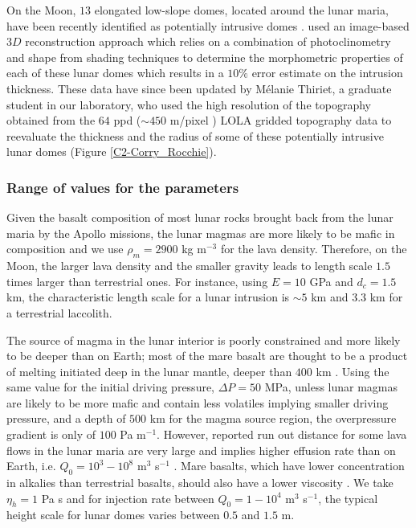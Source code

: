 On the Moon, $13$ elongated  low-slope domes, located around the lunar
maria, have  been recently  identified as potentially  intrusive domes
\citep{Wohler:2007it,Wohler:2009jj}.   \citet{Wohler:2009jj}  used  an
image-based $3D$ reconstruction approach which relies on a combination
of photoclinometry and shape from  shading techniques to determine the
morphometric properties of each of  these lunar domes which results in
a $10\%$  error estimate on  the intrusion thickness. These  data have
since  been updated  by Mélanie  Thiriet,  a graduate  student in  our
laboratory, who  used the high  resolution of the  topography obtained
from  the  $64$ ppd  ($\sim  450$  m/pixel \citep{Zuber:2009bq})  LOLA
gridded topography data to reevaluate  the thickness and the radius of
some of these potentially intrusive lunar domes (Figure \ref{C2-Corry_Rocchie}).

\subsubsection*{Range of values for the parameters}

Given the basalt composition of most lunar rocks brought back from the
lunar maria by  the Apollo missions, the lunar magmas  are more likely
to be mafic in composition and we  use $\rho_m = 2900$ kg m$^{-3}$ for
the lava density. Therefore, on the  Moon, the larger lava density and
the  smaller gravity  leads to  length scale  $1.5$ times  larger than
terrestrial ones. For  instance, using $E=10$ GPa and $d_c  = 1.5$ km,
the characteristic length  scale for a lunar intrusion is  $\sim 5$ km
and $3.3$ km for a terrestrial laccolith.

The source  of magma in the  lunar interior is poorly  constrained and
more likely to  be deeper than on  Earth; most of the  mare basalt are
thought to be a product of melting initiated deep in the lunar mantle,
deeper than $400$ km \citep{Shearer:2006gg}.  Using the same value for
the initial driving pressure, $\Delta P = 50$ MPa, unless lunar magmas
are  likely to  be  more  mafic and  contain  less volatiles  implying
smaller driving pressure, and a depth of $500$ km for the magma source
region,  the  overpressure gradient  is  only  of $100$  Pa  m$^{-1}$.
However, reported  run out distance for  some lava flows in  the lunar
maria are very  large and implies higher effusion rate  than on Earth,
i.e.             $Q_0=10^3-10^8$             m$^3$            s$^{-1}$
\citep{Crisp:1990gf,Zimbelman:1998ww}.  Mare basalts, which have lower
concentration in alkalies than terrestrial basalts, should also have a
lower viscosity \citep{Zimbelman:1998ww}.  We take $\eta_h=1$ Pa s and
for  injection rate  between $Q_0=1-10^4$  m$^{3}$ s$^{-1}$,  the
typical height scale for lunar domes varies between $0.5$ and $1.5$ m.

